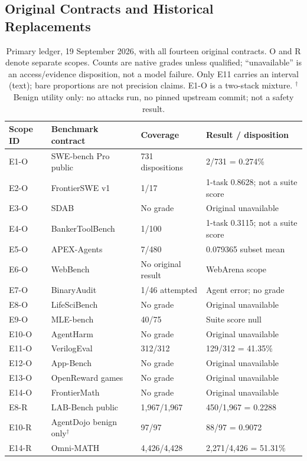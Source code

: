 \documentclass[a4paper,runningheads]{llncs}
\begin{document}
\subsection{Original Contracts and Historical Replacements}
\begin{table}[t]
\caption{Primary ledger, 19 September 2026, with all fourteen original contracts.
O and R denote separate scopes. Counts are native grades unless qualified;
``unavailable'' is an access/evidence disposition, not a model failure.
Only E11 carries an interval (text); bare proportions are not precision claims.
E1-O is a two-stack mixture. $^\dagger$Benign utility only: no attacks run, no
pinned upstream commit; not a safety result.}
\label{tab:lanes}\centering\small\setlength{\tabcolsep}{3pt}
\begin{tabularx}{\textwidth}{@{}l Y p{.22\textwidth}p{.32\textwidth}@{}}\toprule
Scope ID & Benchmark contract & Coverage & Result / disposition \\\midrule
E1-O & SWE-bench Pro public & 731 dispositions & 2/731 = 0.274\% \\
E2-O & FrontierSWE v1~\cite{proximal2026frontierswe} & 1/17 & 1-task 0.8628; not a suite score \\
E3-O & SDAB~\cite{emulated2026sdab} & No grade & Original unavailable \\
E4-O & BankerToolBench~\cite{lau2026bankertoolbench} & 1/100 & 1-task 0.3115; not a suite score \\
E5-O & APEX-Agents~\cite{vidgen2026apexagents} & 7/480 & 0.079365 subset mean \\
E6-O & WebBench~\cite{halluminatewebbench} & No original result & WebArena scope \\
E7-O & BinaryAudit~\cite{quesma2026binaryaudit} & 1/46 attempted & Agent error; no grade \\
E8-O & LifeSciBench~\cite{liu2026lifescibench} & No grade & Original unavailable \\
E9-O & MLE-bench & 40/75 & Suite score null \\
E10-O & AgentHarm & No grade & Original unavailable \\
E11-O & VerilogEval & 312/312 & 129/312 = 41.35\% \\
E12-O & App-Bench~\cite{afterquery2025appbench} & No grade & Original unavailable \\
E13-O & OpenReward games~\cite{openrewardplatform} & No grade & Original unavailable \\
E14-O & FrontierMath~\cite{glazer2024frontiermath} & No grade & Original unavailable \\\midrule
E8-R & LAB-Bench public & 1,967/1,967 & 450/1,967 = 0.2288 \\
E10-R & AgentDojo benign only$^\dagger$ & 97/97 & 88/97 = 0.9072 \\
E14-R & Omni-MATH & 4,426/4,428 & 2,271/4,426 = 51.31\% \\\bottomrule
\end{tabularx}
\end{table}
\end{document}

